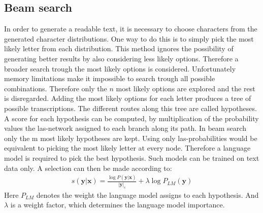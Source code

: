 \subsection{Beam search}
In order to generate a readable text, it is necessary to choose characters from the generated character distributions. One way to do this is to simply pick the most likely letter from each distribution. This method ignores the possibility of generating better results by also considering less likely options. Therefore a broader search trough the most likely options is considered. Unfortunately memory limitations make it impossible to search trough all possible combinations. Therefore only the $n$ most likely options are explored and the rest is disregarded. Adding the most likely options for each letter produces a tree of possible transcriptions. The different routes along this tree are called hypotheses. A score for each hypothesis can be computed, by multiplication of the probability values the las-network assigned to each branch along its path. In beam search only the m most likely hypotheses are kept. Using only las-probabilities would be equivalent to picking the most likely letter at every node. Therefore a language model is required to pick the best hypothesis. Such models can be trained on text data only. A selection can then be made according to\cite[page 6]{Chan2015}:
\begin{align}
s(\mathbf{y}|\mathbf{x}) = \frac{\log P(\mathbf{y}|\mathbf{x})}{ |\mathbf{y}|_c} + \lambda \log P_{LM}(\mathbf{y})
\end{align}
Here $P_{LM}$ denotes the weight the language model assigns to each hypothesis. And $\lambda$ is a weight factor, which determines the language model importance. 





